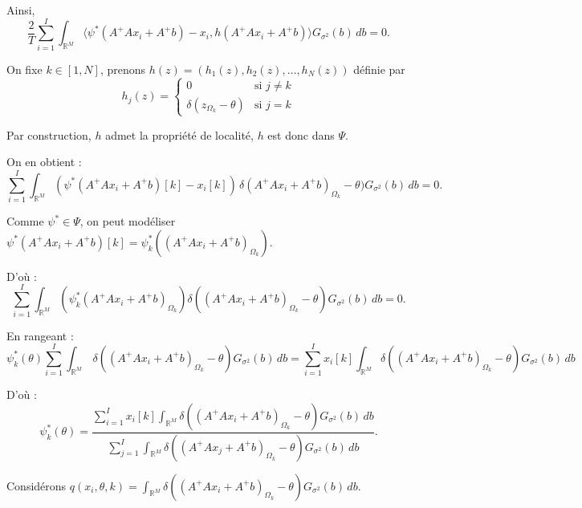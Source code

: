 \documentclass[a4paper,10pt]{article}
\theoremstyle{definition} %
\theoremstyle{definition} %
\theoremstyle{definition} %
\theoremstyle{definition} %
\begin{document}
Ainsi,
\begin{equation*}
    \frac{2}{T} \sum_{i=1}^I \int_{\mathbb{R}^M} \langle \psi^*(A^+A x_i + A^+b) - x_i, h(A^+A x_i + A^+b) \rangle G_{\sigma^2}(b) \, db = 0.
\end{equation*}


On fixe $k \in [1, N]$, prenons $h(z) = (h_1(z), h_2(z), \dots, h_N(z))$ définie par
\begin{equation}
    h_j(z) =
\begin{cases}
0 & \text{si } j \neq k \\
\delta(z_{\Omega_k} - \theta) & \text{si } j = k
\end{cases}
\end{equation}


Par construction, $h$ admet la propriété de localité, $h$ est donc dans $\Psi$.

On en obtient :
\begin{equation*}
\sum_{i=1}^I \int_{\mathbb{R}^M} (\psi^*(A^+A x_i + A^+b)[k] - x_i[k]) \,\delta(A^+A x_i + A^+b)_{\Omega_k} - \theta) G_{\sigma^2}(b) \, db = 0.    
\end{equation*}


Comme $\psi^* \in \Psi$, on peut modéliser $\psi^*(A^+A x_i + A^+b)[k] = \psi_k^*\left((A^+A x_i + A^+b)_{\Omega_k}\right)$.

D'où :
\begin{equation*}
\sum_{i=1}^I \int_{\mathbb{R}^M} \left(\psi^*_k(A^+A x_i + A^+b)_{\Omega_k}\right) \delta\left((A^+A x_i + A^+b)_{\Omega_k} - \theta\right) G_{\sigma^2}(b) \, db = 0.    
\end{equation*}


En rangeant :
\begin{equation*}
\psi^*_k(\theta)\sum_{i=1}^I \int_{\mathbb{R}^M} \,\delta\left((A^+A x_i + A^+b)_{\Omega_k} - \theta\right) G_{\sigma^2}(b) \, db = \sum_{i=1}^I x_i[k] \int_{\mathbb{R}^M} \delta\left((A^+A x_i + A^+b)_{\Omega_k} - \theta\right) G_{\sigma^2}(b) \, db    
\end{equation*}


D'où :
\begin{equation*}
\psi^*_k(\theta) = \frac{\sum_{i=1}^I x_i[k] \int_{\mathbb{R}^M} \delta\left((A^+A x_i + A^+b)_{\Omega_k} - \theta\right) G_{\sigma^2}(b) \, db}{\sum_{j=1}^I \int_{\mathbb{R}^M} \delta\left((A^+A x_j + A^+b)_{\Omega_k} - \theta\right) G_{\sigma^2}(b) \, db}.    
\end{equation*}


Considérons $q(x_i, \theta, k) = \int_{\mathbb{R}^M} \delta\left((A^+A x_i + A^+b)_{\Omega_k} - \theta\right) G_{\sigma^2}(b) \, db$.
\end{document}
